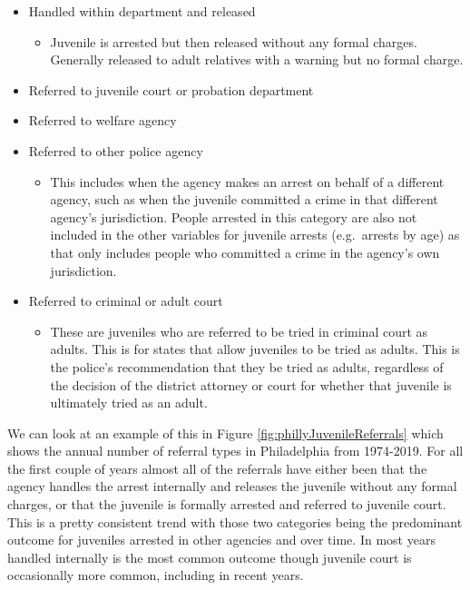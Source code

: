 \documentclass[
  12pt,
  openany]{book}
\providecommand{\tightlist}{%
  \setlength{\itemsep}{0pt}\setlength{\parskip}{0pt}}
\begin{document}
\begin{itemize}
\tightlist
\item
  Handled within department and released

  \begin{itemize}
  \tightlist
  \item
    Juvenile is arrested but then released without any formal charges. Generally released to adult relatives with a warning but no formal charge.
  \end{itemize}
\item
  Referred to juvenile court or probation department
\item
  Referred to welfare agency
\item
  Referred to other police agency

  \begin{itemize}
  \tightlist
  \item
    This includes when the agency makes an arrest on behalf of a different agency, such as when the juvenile committed a crime in that different agency's jurisdiction. People arrested in this category are also not included in the other variables for juvenile arrests (e.g.~arrests by age) as that only includes people who committed a crime in the agency's own jurisdiction.
  \end{itemize}
\item
  Referred to criminal or adult court

  \begin{itemize}
  \tightlist
  \item
    These are juveniles who are referred to be tried in criminal court as adults. This is for states that allow juveniles to be tried as adults. This is the police's recommendation that they be tried as adults, regardless of the decision of the district attorney or court for whether that juvenile is ultimately tried as an adult.
  \end{itemize}
\end{itemize}

We can look at an example of this in Figure \ref{fig:phillyJuvenileReferrals} which shows the annual number of referral types in Philadelphia from 1974-2019. For all the first couple of years almost all of the referrals have either been that the agency handles the arrest internally and releases the juvenile without any formal charges, or that the juvenile is formally arrested and referred to juvenile court. This is a pretty consistent trend with those two categories being the predominant outcome for juveniles arrested in other agencies and over time. In most years handled internally is the most common outcome though juvenile court is occasionally more common, including in recent years.
\end{document}
